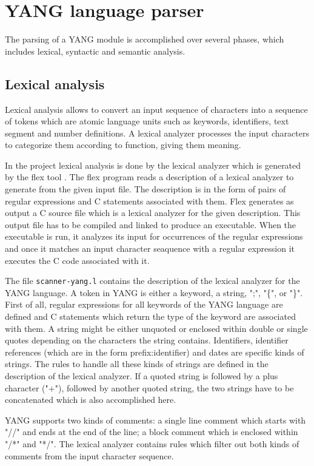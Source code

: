 \documentclass[conference]{IEEEtran}
\begin{document}
\section{YANG language parser}
The parsing of a YANG module is accomplished over several phases, which includes lexical, syntactic and semantic analysis.
\subsection{Lexical analysis}
Lexical analysis allows to convert an input sequence of characters into a sequence of tokens which are atomic language units such as keywords, identifiers, text segment and number definitions. A lexical analyzer processes the input characters to categorize them according to function, giving them meaning.

In the project lexical analysis is done by the lexical analyzer which is generated by the flex tool \cite{bib5}. The flex program reads a description of a lexical analyzer to generate from the given input file. The description is in the form of pairs of regular expressions and C statements associated with them. Flex generates as output a C source file which is a lexical analyzer for the given description. This output file has to be compiled and linked to produce an executable. When the executable is run, it analyzes its input for occurrences of the regular expressions and once it matches an input character seaquence with a regular expression it executes the C code associated with it.

The file \texttt{scanner-yang.l} contains the description of the lexical analyzer for the YANG language. A token in YANG is either a keyword, a string, ";", "\{", or "\}". First of all, regular expressions for all keywords of the YANG language are defined and C statements which return the type of the keyword are associated with them. A string might be either unquoted  or enclosed within double or single quotes depending on the characters the string contains. Identifiers, identifier references (which are in the form prefix:identifier) and dates  are specific kinds of strings. The rules to handle all these kinds of strings are defined in the description of the lexical analyzer. If a quoted string is followed by a plus character ("+"), followed by
 another quoted string, the two strings have to be concatenated which is also accomplished here.

YANG supports two kinds of comments: a single line comment which starts with "//" and  ends at the end of the line; a block comment which is enclosed within "/*"  and "*/". The lexical analyzer contains rules which filter out both kinds of comments from the input character sequence.
\end{document}

